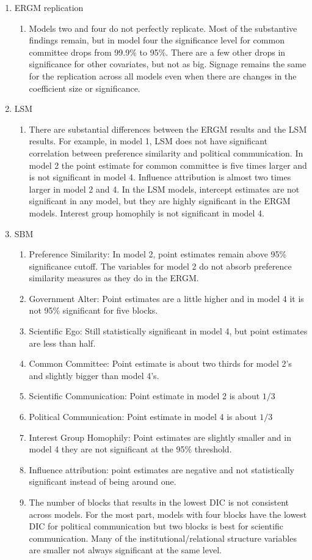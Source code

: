 \documentclass[fleqn,12pt]{wlscirep}
\begin{document}
\begin{enumerate}

\item ERGM replication
\begin{enumerate}
\item Models two and four do not perfectly replicate. Most of the substantive findings remain, but in model four the significance level for common committee drops from 99.9\% to 95\%. There are a few other drops in significance for other covariates, but not as big. Signage remains the same for the replication across all models even when there are changes in the coefficient size or significance. 
\end{enumerate}


\item LSM
\begin{enumerate}
\item There are substantial differences between the ERGM results and the LSM results. For example, in model 1, LSM does not have significant correlation between preference similarity and political communication. In model 2 the point estimate for common committee is five times larger  and  is not significant in model 4. Influence attribution is almost two times larger in model 2 and 4. In the LSM models, intercept estimates are not significant in any model, but they are highly significant in the ERGM models. Interest group homophily is not significant in model 4.
\end{enumerate}

\item SBM
\begin{enumerate}
\item Preference Similarity: In model 2, point estimates remain above 95\% significance cutoff. The variables for model 2 do not absorb preference similarity measures as they do in the ERGM.  
\item Government Alter: Point estimates are a little higher and in model 4 it is not 95\% significant for five blocks. 
\item Scientific Ego: Still statistically significant in model 4, but point estimates are less than half. 
\item Common Committee: Point estimate is about two thirds for model 2's and slightly bigger than model 4's.
\item Scientific Communication: Point estimate in model 2 is about $1/3$
\item Political Communication: Point estimate in model 4 is about $1/3$
\item Interest Group Homophily: Point estimates are slightly smaller and in model 4 they are not significant at the 95\% threshold. 
\item Influence attribution: point estimates are negative and not statistically significant instead of being around one. 
\item The number of blocks that results in the lowest DIC is not consistent across models. For the most part, models with four blocks have the lowest DIC for political communication but two blocks is best for scientific communication. Many of the institutional/relational structure variables are smaller not always significant at the same level.


\end{enumerate}
\end{enumerate}
\end{document}
